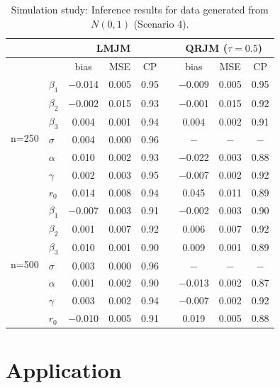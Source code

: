\begin{table}[H]
\centering
\caption{Simulation study: Inference results for data generated from $N(0, 1)$ (Scenario 4).}
\label{tab:p2simsce4}
\begin{tabular}{clccccccc}
\hline
& & \multicolumn{3}{c}{LMJM} & & \multicolumn{3}{c}{QRJM ($\tau=0.5$)}\\
\hline
 & & bias & MSE & CP && bias & MSE & CP \\
 \cline{3-5}  \cline{7-9}
   \multirow{7}{*}{n=250} & $\beta_1$ & $-$0.014 & 0.005 & 0.95 && $-$0.009 & 0.005 & 0.95 \\
  &   $\beta_2$ & $-$0.002 & 0.015 & 0.93 && $-$0.001 & 0.015 & 0.92 \\
  &   $\beta_3$ & 0.004 & 0.001 & 0.94 && 0.004 & 0.002 & 0.91 \\
  &   $\sigma$ & 0.004 & 0.000 & 0.96 &&  $-$ & $-$ & $-$ \\
  &   $\alpha$ & 0.010 & 0.002 & 0.93 && $-$0.022 & 0.003 & 0.88 \\
  &   $\gamma$ & 0.002 & 0.003 & 0.95 && $-$0.007 & 0.002 & 0.92 \\
  &   $r_0$ & 0.014 & 0.008 & 0.94 && 0.045 & 0.011 & 0.89 \\
   \hline
  \multirow{7}{*}{n=500} & $\beta_1$ & $-$0.007 & 0.003 & 0.91 && $-$0.002 & 0.003 & 0.90 \\
  & $\beta_2$ & 0.001 & 0.007 & 0.92 && 0.006 & 0.007 & 0.92 \\
  & $\beta_3$ & 0.010 & 0.001 & 0.90 && 0.009 & 0.001 & 0.89 \\
  & $\sigma$ & 0.003 & 0.000 & 0.96 &&  $-$ & $-$ & $-$ \\
  & $\alpha$ & 0.001 & 0.002 & 0.90 && $-$0.013 & 0.002 & 0.87 \\
  & $\gamma$ & 0.003 & 0.002 & 0.94 && $-$0.007 & 0.002 & 0.92 \\
  & $r_0$ & $-$0.010 & 0.005 & 0.91 && 0.019 & 0.005 & 0.88 \\
   \hline
\end{tabular}
\end{table}



\section{Application}\label{sec:p2data}
